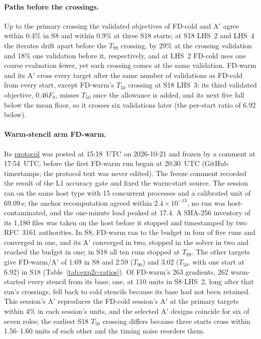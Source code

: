 \documentclass{anvil-paper}
\begin{document}
\begin{table}[H]\centering\small
\caption{Final checks of the ablation's selected designs, as in
Table~\ref{tab:exp2-refinement}: L2 objective, L3 change, the largest
40-angle, tight or shifted change, and the conforming change where stator
offsets are zero.}
\label{tab:exp2b-refinement}
\end{table}

\paragraph{Paths before the crossings.}
Up to the primary crossing the validated objectives of FD-cold and A$'$ agree
within 0.4\% in S8 and within 0.9\% at three S18 starts; at
S18 LHS~2 and LHS~4 the iterates drift apart before the $T_{99}$
crossing, by 29\% at the crossing validation and 18\% one validation
before it, respectively, and at LHS~2 FD-cold uses one coarse evaluation fewer, yet each
crossing comes at the same validation. FD-warm and its A$'$ cross every
target after the same number of validations as FD-cold from every start, except
FD-warm's $T_{50}$ crossing at S18 LHS~3: its third validated objective,
$0.46F_0$, misses $T_{50}$ once the allowance is added, and its next five
fall below the mean floor, so it crosses six validations later (the
per-start ratio of 6.92 below).

\paragraph{Warm-stencil arm FD-warm.}
Its \href{https://github.com/rjwalters/geode-fem/issues/1224}{protocol} was
posted at 15:18~UTC on 2026-10-21 and frozen by a comment at 17:54~UTC,
before the first FD-warm run began at 20:30~UTC (GitHub timestamps; the
protocol text was never edited). The freeze comment recorded the result of
the L1 accuracy gate and fixed the warm-start source. The session ran on the same host type with
15 concurrent processes and a calibrated unit of $69.09\,\mathrm{s}$; the
anchor recomputation agreed within $2.4\times10^{-13}$, no run was
host-contaminated, and the one-minute load peaked at 17.4. A SHA-256
inventory of its 1,180 files was taken on the host before it stopped and
timestamped by two RFC~3161 authorities. In S8, FD-warm ran to the budget
in four of five runs and converged in one, and its A$'$ converged in two,
stopped in the solver in two and reached the budget in one; in S18 all
ten runs stopped at $T_{99}$. The other targets give FD-warm/A$'$ of 1.69 in
S8 and 2.59 ($T_{90}$) and 3.02 ($T_{50}$, with one start at 6.92) in
S18 (Table~\ref{tab:exp2c-ratios}). Of FD-warm's 263 gradients, 262
warm-started every stencil from its base; one, at 110 units in S8
LHS~2, long after that run's crossings, fell back to cold stencils because
its base had not been retained.
This session's A$'$ reproduces the FD-cold session's A$'$ at the primary targets
within 4\% in each session's units, and the selected A$'$ designs coincide
for six of seven roles; the earliest S18 $T_{50}$ crossing differs
because three starts cross within 1.56--1.60 units of each other and the
timing noise reorders them.
\end{document}
